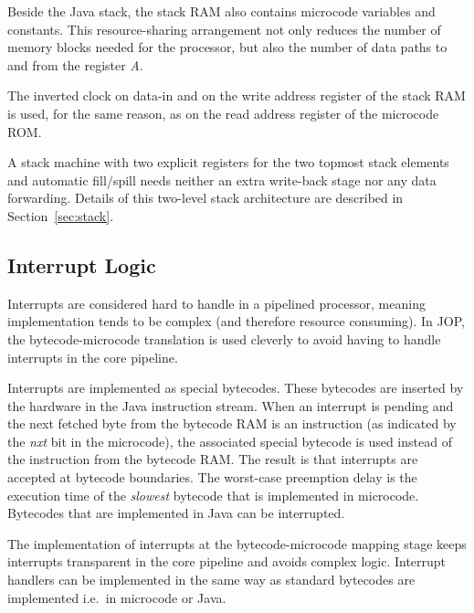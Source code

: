 Beside the Java stack, the stack RAM also contains microcode
variables and constants. This resource-sharing arrangement not only
reduces the number of memory blocks needed for the processor, but
also the number of data paths to and from the register \nolinebreak
\emph{A}.

The inverted clock on data-in and on the write address register of
the stack RAM is used, for the same reason, as on the read address
register of the microcode ROM.

A stack machine with two explicit registers for the two topmost
stack elements and automatic fill/spill needs neither an extra
write-back stage nor any data forwarding. Details of this two-level
stack architecture are described in Section~\ref{sec:stack}.

%
%

\subsection{Interrupt Logic}
\label{sec:interrupt}

Interrupts are considered hard to handle in a pipelined processor,
meaning implementation tends to be complex (and therefore resource
consuming). In JOP, the bytecode-microcode translation is used
cleverly to avoid having to handle interrupts in the core pipeline.

Interrupts are implemented as special bytecodes. These bytecodes are
inserted by the hardware in the Java instruction stream. When an
interrupt is pending and the next fetched byte from the bytecode RAM
is an instruction (as indicated by the \emph{nxt} bit in the
microcode), the associated special bytecode is used instead of the
instruction from the bytecode RAM. The result is that interrupts are
accepted at bytecode boundaries. The worst-case preemption delay is
the execution time of the \emph{slowest} bytecode that is
implemented in microcode. Bytecodes that are implemented in Java can
be interrupted.

The implementation of interrupts at the bytecode-microcode mapping
stage keeps interrupts transparent in the core pipeline and avoids
complex logic. Interrupt handlers can be implemented in the same way
as standard bytecodes are implemented i.e.\ in microcode or Java.

